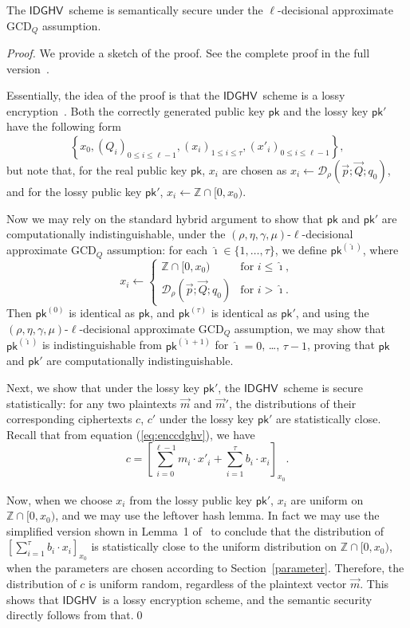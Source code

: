\documentclass{llncs}
\renewcommand\leq\leqslant
\newcommand{\Z}{{\mathbb Z}}
\newcommand*{\pk}{\ensuremath{\mathsf{pk}}}
\newcommand*{\CDGHV}{\ensuremath{\mathsf{IDGHV}}}
\newcommand*\D{\ensuremath{\mathcal D}}
\begin{document}
\begin{theorem}
The \CDGHV\ scheme is semantically secure under the $\ell$-decisional approximate $\mathrm{GCD}_Q$ assumption.
\end{theorem}
\begin{proof}
We provide a sketch of the proof.  See the complete proof in the full version~\cite{KLYC2013}.

Essentially, the idea of the proof is that the \CDGHV\ scheme is a lossy encryption~\cite{BHY2009}.  Both the correctly generated public key $\pk$ and the lossy key $\pk'$ have the following form
\[
\left\{ x_0, \left(Q_i\right)_{0\leq i \leq \ell-1},\left(x_i\right)_{1\leq i\leq \tau}, \left(x'_i\right)_{0\leq i\leq \ell-1}\right\},
\]
but note that, for the real public key $\pk$, $x_i$ are chosen as $x_i\gets\D_\rho(\vec{p}; \vec{Q}; q_0)$,
and for the lossy public key $\pk'$, $x_i\gets\Z\cap[0,x_0)$.

Now we may rely on the standard hybrid argument to show that $\pk$ and $\pk'$ are computationally indistinguishable, under the $(\rho,\eta,\gamma,\mu)$-$\ell$-decisional approximate GCD$_Q$ assumption: for each $\hat\imath\in\{1, \dots, \tau\}$, we define $\pk^{(\hat\imath)}$, where
\[
x_i \gets \begin{cases}
\Z\cap[0,x_0)&\text{for $i\leq \hat\imath$},\\
\D_\rho(\vec{p}; \vec{Q}; q_0)&\text{for $i>\hat\imath$}.
\end{cases}
\]
Then $\pk^{(0)}$ is identical as $\pk$, and $\pk^{(\tau)}$ is identical as $\pk'$, and using the $(\rho,\eta,\gamma,\mu)$-$\ell$-decisional approximate GCD$_Q$ assumption, we may show that $\pk^{(\hat\imath)}$ is indistinguishable from $\pk^{(\hat\imath+1)}$ for $\hat\imath=0$, \dots, $\tau-1$,
proving that $\pk$ and $\pk'$ are computationally indistinguishable.

Next, we show that under the lossy key $\pk'$, the \CDGHV\ scheme is
secure statistically: for any two plaintexts $\vec{m}$ and $\vec{m}'$,
the distributions of their corresponding ciphertexts $c$, $c'$ under
the lossy key $\pk'$ are statistically close.  Recall that from
equation (\ref{eq:enccdghv}), we have
\begin{equation*}
c = \left[\sum\limits_{i=0}^{\ell-1} m_i \cdot x'_i + 
	\sum_{i=1}^\tau 
b_i\cdot x_i\right]_{x_0}.
\end{equation*}

Now, when we choose $x_i$ from the lossy public key $\pk'$, $x_i$ are uniform on $\Z\cap[0,x_0)$, and we may use the leftover hash lemma.  In fact we may use the simplified version shown in Lemma~1 of~\cite{vDGHV2010} to conclude that the distribution of $[\sum_{i=1}^\tau b_i\cdot x_i]_{x_0}$ is statistically close to the uniform distribution on $\Z\cap[0,x_0)$, when the parameters are chosen according to Section~\ref{parameter}.  Therefore, the distribution of $c$ is uniform random, regardless of the plaintext vector $\vec{m}$.  This shows that \CDGHV\ is a lossy encryption scheme, and the semantic security directly follows from that.\qed
\end{proof}
\end{document}
